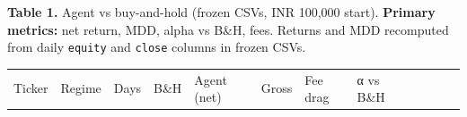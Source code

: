 \documentclass[
]{article}
\newcounter{none} %
\begin{document}
\textbf{Table 1.} Agent vs buy-and-hold (frozen CSVs, INR 100,000 start).
\textbf{Primary metrics:} net return, MDD, alpha vs B\&H, fees. Returns
and MDD recomputed from daily \texttt{equity} and \texttt{close} columns
in frozen CSVs.

{\def\LTcaptype{none} %
\begin{longtable}[]{@{}
  >{\raggedright\arraybackslash}p{}
  >{\raggedright\arraybackslash}p{}
  >{\raggedright\arraybackslash}p{}
  >{\raggedright\arraybackslash}p{}
  >{\raggedright\arraybackslash}p{}
  >{\raggedright\arraybackslash}p{}
  >{\raggedright\arraybackslash}p{}
  >{\raggedright\arraybackslash}p{}
  >{\raggedright\arraybackslash}p{}
  >{\raggedright\arraybackslash}p{}
  >{\raggedright\arraybackslash}p{}
  >{\raggedright\arraybackslash}p{}@{}}
\toprule\noalign{}
\begin{minipage}[b]{\linewidth}\raggedright
Ticker
\end{minipage} & \begin{minipage}[b]{\linewidth}\raggedright
Regime
\end{minipage} & \begin{minipage}[b]{\linewidth}\raggedright
Days
\end{minipage} & \begin{minipage}[b]{\linewidth}\raggedright
B\&H
\end{minipage} & \begin{minipage}[b]{\linewidth}\raggedright
Agent (net)
\end{minipage} & \begin{minipage}[b]{\linewidth}\raggedright
Gross
\end{minipage} & \begin{minipage}[b]{\linewidth}\raggedright
Fee drag
\end{minipage} & \begin{minipage}[b]{\linewidth}\raggedright
α vs B\&H
\end{minipage} & \begin{minipage}[b]{\linewidth}\raggedright

\end{minipage}
\end{longtable}}
\end{document}
